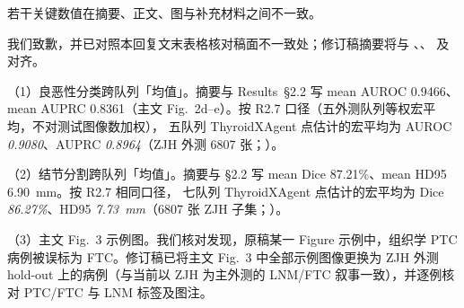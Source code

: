 \begin{reviewercomment}
若干关键数值在摘要、正文、图与补充材料之间不一致。
\end{reviewercomment}
\begin{authorresponse}
我们致歉，并已对照本回复文末表格核对稿面不一致处；修订稿摘要将与 、、 及  对齐。\par
（1）良恶性分类跨队列「均值」。摘要与 Results~§2.2 写 mean AUROC 0.9466、mean AUPRC 0.8361（主文 Fig.~2d--e）。按 R2.7 口径（五外测队列等权宏平均，不对测试图像数加权）， 五队列 ThyroidXAgent 点估计的宏平均为 AUROC \emph{0.9080}、AUPRC \emph{0.8964}（ZJH 外测 6807 张；）。\par
（2）结节分割跨队列「均值」。摘要与 §2.2 写 mean Dice 87.21\%、mean HD95 6.90~mm。按 R2.7 相同口径， 七队列 ThyroidXAgent 点估计的宏平均为 Dice \emph{86.27\%}、HD95 \emph{7.73~mm}（6807 张 ZJH 子集；）。\par
（3）主文 Fig.~3 示例图。我们核对发现，原稿某一 Figure 示例中，组织学 PTC 病例被误标为 FTC。修订稿已将主文 Fig.~3 中全部示例图像更换为 ZJH 外测 hold-out 上的病例（与当前以 ZJH 为主外测的 LNM/FTC 叙事一致），并逐例核对 PTC/FTC 与 LNM 标签及图注。\par
\par
\end{authorresponse}

